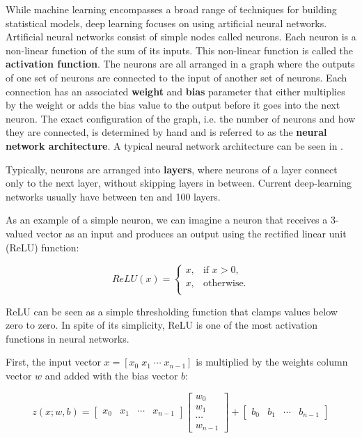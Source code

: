 While machine learning encompasses a broad range of techniques for building statistical models, deep learning focuses on using artificial neural networks. Artificial neural networks consist of simple nodes called neurons. Each neuron is a non-linear function of the sum of its inputs. This non-linear function is called the \textbf{activation function}. The neurons are all arranged in a graph where the outputs of one set of neurons are connected to the input of another set of neurons. Each connection has an associated \textbf{weight} and \textbf{bias} parameter that either multiplies by the weight or adds the bias value to the output before it goes into the next neuron. The exact configuration of the graph, i.e. the number of neurons and how they are connected, is determined by hand and is referred to as the \textbf{neural network architecture}. A typical neural network architecture can be seen in .

Typically, neurons are arranged into \textbf{layers}, where neurons of a layer connect only to the next layer, without skipping layers in between. Current deep-learning networks usually have between ten and 100 layers.

As an example of a simple neuron, we can imagine a neuron that receives a 3-valued vector as an input and produces an output using the rectified linear unit (ReLU) function:

\begin{equation}
ReLU(x) = 
    \begin{cases}
        x, & \text{if } x > 0,\\
        x, & \text{otherwise.}\\
    \end{cases}
\end{equation}

ReLU can be seen as a simple thresholding function that clamps values below zero to zero. In spite of its simplicity, ReLU is one of the most activation functions in neural networks.

First, the input vector $x = [x_0\; x_1\; \cdots\; x_{n - 1}]$ is multiplied by the weights column vector $w$ and added with the bias vector $b$:

\begin{equation}
z(x;w, b) =
\begin{bmatrix}
x_0 & x_1 & \cdots & x_{n - 1}
\end{bmatrix}
\begin{bmatrix}
w_0\\
w_1\\
\cdots\\
w_{n-1}
\end{bmatrix}
+
\begin{bmatrix}
b_0 & b_1 & \cdots & b_{n - 1}
\end{bmatrix}
\end{equation}

